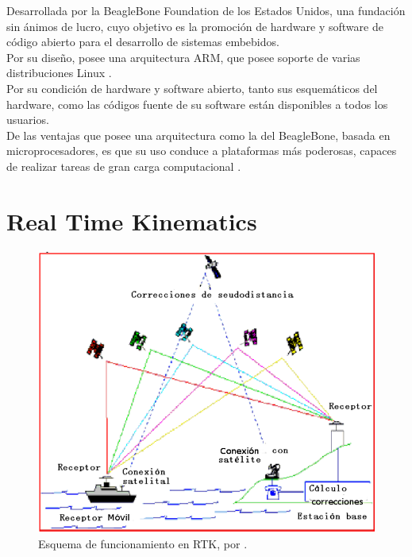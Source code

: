 Desarrollada por la BeagleBone Foundation de los Estados Unidos, una fundación sin ánimos de lucro, cuyo objetivo es la promoción de hardware y software de código abierto para el desarrollo de sistemas embebidos. \\

Por su diseño, posee una arquitectura ARM, que posee soporte de varias distribuciones Linux \cite{coronado2014desarrollo}. \\

Por su condición de hardware y software abierto, tanto sus esquemáticos del hardware, como las códigos fuente de su software están disponibles a todos los usuarios. \\

De las ventajas que posee una arquitectura como la del BeagleBone, basada en microprocesadores, es que su uso conduce a plataformas más poderosas, capaces de realizar tareas de gran carga computacional \cite{coley2013beaglebone}.

\section{Real Time Kinematics}

\begin{figure}[ht]
\centering
\includegraphics[scale=0.30]{Figures/DGPS1}
\caption[Esquema de funcionamiento en RTK.]{Esquema de funcionamiento en RTK, por \cite{fallas2002sistema}.}
\label{fig:RTK}
\end{figure}


